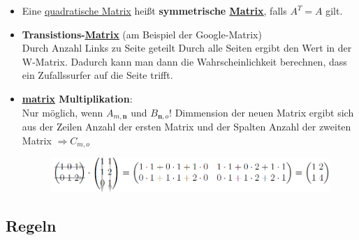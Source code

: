 \documentclass{scrartcl}
\newcommand{\linkTo}[1]{\hyperref[#1]{\underline{#1}}}
\newcommand{\linkToRef}[2][ref]{\hyperref[#1]{\underline{#2}}}
\begin{document}
\begin{itemize}
\item Eine \linkTo{quadratische Matrix} heißt \label{symmetrische Matrix} \textbf{symmetrische \linkTo{Matrix}}, falls $A^T = A$ gilt.

\item \label{Transistions-Matrix} \textbf{Transistions-\linkTo{Matrix}} (am Beispiel der Google-Matrix)\\
Durch Anzahl Links zu Seite geteilt Durch alle Seiten ergibt den Wert in der W-Matrix. Dadurch kann man dann die Wahrscheinlichkeit berechnen, dass ein Zufallssurfer auf die Seite trifft.

\item \label{matrix Multiplikation} \textbf{\linkToRef[Matrix]{matrix} Multiplikation}:\\
Nur möglich, wenn $A_{m,\textbf{n}}$ und $B_{\textbf{n},o}$! Dimmension der neuen Matrix ergibt sich aus der Zeilen Anzahl der ersten Matrix und der Spalten Anzahl der zweiten Matrix $\Rightarrow C_{m,o}$
\begin{figure}[htp]
    \centering
    \includegraphics[width=15cm]{Multi}
    \label{fig:multiplikation}
\end{figure}

\end{itemize}

\subsection{Regeln}
\end{document}
